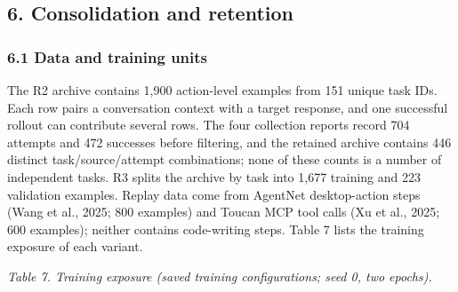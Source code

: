 \documentclass[
  10pt,
]{article}
\newcounter{none} %
\begin{document}
\subsection{6. Consolidation and
retention}\label{consolidation-and-retention}

\subsubsection{6.1 Data and training
units}\label{data-and-training-units}

The R2 archive contains 1,900 action-level examples from 151 unique task
IDs. Each row pairs a conversation context with a target response, and
one successful rollout can contribute several rows. The four collection
reports record 704 attempts and 472 successes before filtering, and the
retained archive contains 446 distinct task/source/attempt combinations;
none of these counts is a number of independent tasks. R3 splits the
archive by task into 1,677 training and 223 validation examples. Replay
data come from AgentNet desktop-action steps (Wang et al., 2025; 800
examples) and Toucan MCP tool calls (Xu et al., 2025; 600 examples);
neither contains code-writing steps. Table 7 lists the training exposure
of each variant.

\emph{Table 7. Training exposure (saved training configurations; seed 0,
two epochs).}
\end{document}
